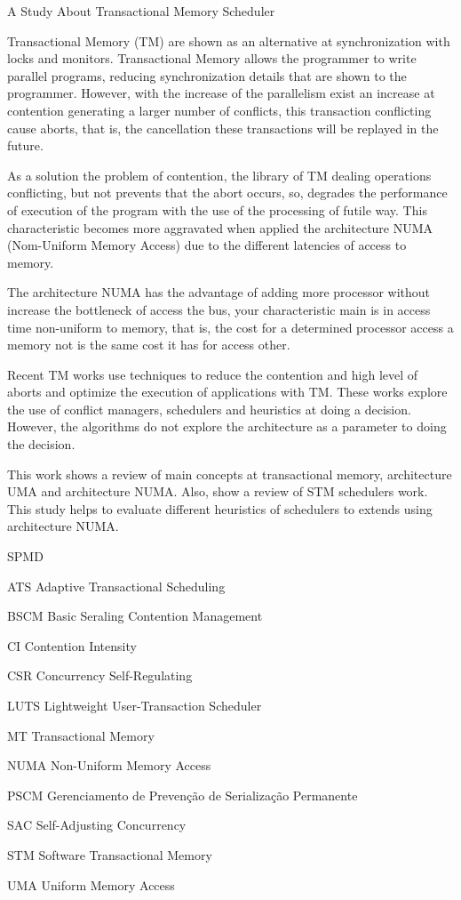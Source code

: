 \documentclass[ti]{texufpel}
\begin{document}
\begin{englishabstract}
 {A Study About Transactional Memory Scheduler}

Transactional Memory (TM) are shown as an alternative at synchronization with locks and monitors. Transactional Memory allows the programmer to write parallel programs, reducing synchronization details that are shown to the programmer. However, with the increase of the parallelism exist an increase at contention generating a larger number of conflicts, this transaction conflicting cause aborts, that is, the cancellation these transactions will be replayed in the future.

As a solution the problem of contention, the library of TM dealing operations conflicting, but not prevents that the abort occurs, so, degrades the performance of execution of the program with the use of the processing of futile way. This characteristic becomes more aggravated when applied the architecture NUMA (Nom-Uniform Memory Access) due to the different latencies of access to memory.

The architecture NUMA has the advantage of adding more processor without increase the bottleneck of access the bus, your characteristic main is in access time non-uniform to memory, that is, the cost for a determined processor access a memory not is the same cost it has for access other.

Recent TM works use techniques to reduce the contention and high level of aborts and optimize the execution of applications with TM. These works explore the use of conflict managers, schedulers and heuristics at doing a decision. However, the algorithms do not explore the architecture as a parameter to doing the decision.

This work shows a review of main concepts at transactional memory, architecture UMA and architecture NUMA. Also, show a review of STM schedulers work. This study helps to evaluate different heuristics of schedulers to extends using architecture NUMA.


\end{englishabstract}

\listoffigures

\listoftables

\begin{listofabbrv}{SPMD}
 \item[ATS] Adaptive Transactional Scheduling
 \item[BSCM] Basic Seraling Contention Management
 \item[CI] Contention Intensity
 \item[CSR] Concurrency Self-Regulating
 \item[LUTS] Lightweight User-Transaction Scheduler
 \item[MT] Transactional Memory
 \item[NUMA] Non-Uniform Memory Access
 \item[PSCM] Gerenciamento de Prevenção de Serialização Permanente
 \item[SAC] Self-Adjusting Concurrency
 \item[STM] Software Transactional Memory
 \item[UMA] Uniform Memory Access
\end{listofabbrv}
\end{document}
